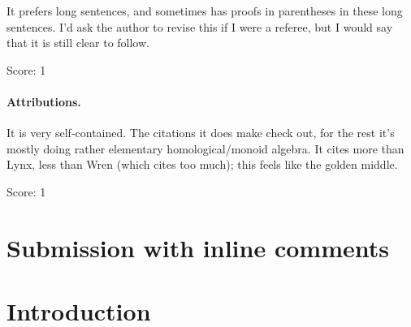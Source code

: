 \documentclass[11pt]{article}
\newcommand{\gp}{\mathrm{gp}}
\newcommand{\R}{\mathrm R}
\theoremstyle{definition}
\theoremstyle{remark}
\begin{document}
It prefers long sentences, and sometimes has proofs in parentheses in these long sentences. I'd ask the author to revise this if I were a referee, but I would say that it is still clear to follow.

\noindent Score: 1

\paragraph{Attributions.}
It is very self-contained. The citations it does make check out, for the rest it's mostly doing rather elementary homological/monoid algebra. It cites more than Lynx, less than Wren (which cites too much); this feels like the golden middle.

\noindent Score: 1

\newpage
\section{Submission with inline comments}


\begin{abstract}
Let \(P\) be an integral, saturated, sharp commutative monoid, let \(A_P\) be
the category of monoids under \(P\), equipped with the birhizomic topology on
\(A_P^{\mathrm{op}}\), and let \(B_P\subset A_P\) be the full subcategory of
the sharpened localizations \(P\to P[-x]^\sharp\), \(x\in P\), with the
trivial topology (all definitions are recalled in \S1).  The inclusion
induces an inverse image functor \(\pi^{-1}\) from presheaves on
\(B_P^{\mathrm{op}}\) to birhizomic sheaves, with right adjoint \(\pi_*\),
and the question answered here asks whether \(F\to\R\pi_*\pi^{-1}F\) is a
quasi-isomorphism for every presheaf of abelian groups \(F\) on
\(B_P^{\mathrm{op}}\).  We show that it is, for every \(P\), with no
finiteness hypothesis.  The proof replaces the birhizomic topology by a
finer auxiliary topology generated by binary ``sign covers''
\(\{R\to R\langle x\rangle,\ R\to R\langle -x\rangle\}\), where
\(R\langle \pm x\rangle\) is the universal monoid under \(R\) in which
\(\pm x\in R^{\gp}\) becomes nonnegative; a compactness argument shows that
every birhizomic cover is a cover for it, and the left Kan extension of
\(F\) turns out to be a sheaf for it with split exact Mayer--Vietoris
sequences, hence acyclic by an induction on the degree.  Acyclicity then
descends to the coarser birhizomic topology.
\end{abstract}

\section{Introduction}
\end{document}
